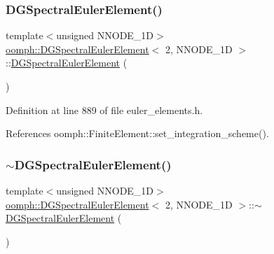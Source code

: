 \subsubsection{\texorpdfstring{D\+G\+Spectral\+Euler\+Element()}{DGSpectralEulerElement()}}
{\footnotesize\ttfamily template$<$unsigned N\+N\+O\+D\+E\+\_\+1D$>$ \\
\hyperlink{classoomph_1_1DGSpectralEulerElement}{oomph\+::\+D\+G\+Spectral\+Euler\+Element}$<$ 2, N\+N\+O\+D\+E\+\_\+1D $>$\+::\hyperlink{classoomph_1_1DGSpectralEulerElement}{D\+G\+Spectral\+Euler\+Element} (\begin{DoxyParamCaption}{ }\end{DoxyParamCaption})\hspace{0.3cm}{\ttfamily [inline]}}



Definition at line 889 of file euler\+\_\+elements.\+h.



References oomph\+::\+Finite\+Element\+::set\+\_\+integration\+\_\+scheme().

\mbox{\label{classoomph_1_1DGSpectralEulerElement_3_012_00_01NNODE__1D_01_4_a6d74232028a84f5cd43bc13fc280f325}} 
\subsubsection{\texorpdfstring{$\sim$\+D\+G\+Spectral\+Euler\+Element()}{~DGSpectralEulerElement()}}
{\footnotesize\ttfamily template$<$unsigned N\+N\+O\+D\+E\+\_\+1D$>$ \\
\hyperlink{classoomph_1_1DGSpectralEulerElement}{oomph\+::\+D\+G\+Spectral\+Euler\+Element}$<$ 2, N\+N\+O\+D\+E\+\_\+1D $>$\+::$\sim$\hyperlink{classoomph_1_1DGSpectralEulerElement}{D\+G\+Spectral\+Euler\+Element} (\begin{DoxyParamCaption}{ }\end{DoxyParamCaption})\hspace{0.3cm}{\ttfamily [inline]}}



